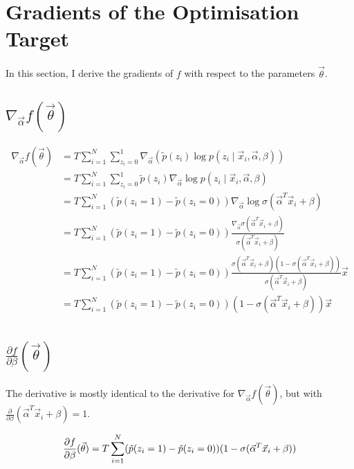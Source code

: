 \documentclass[a4paper]{article}
\begin{document}
    \section{Gradients of the Optimisation Target}

        In this section, I derive the gradients of $f$ with respect to the parameters $\vec \theta$.

        \subsection{$\nabla_{\vec \alpha} f(\vec \theta)$}

            \begin{align*}
                \nabla_{\vec \alpha} f(\vec \theta) &= T \sum_{i = 1}^N \sum_{z_i = 0}^1 \nabla_{\vec \alpha} (\tilde p(z_i) \log p(z_i \mid \vec x_i, \vec \alpha, \beta))\\
                    &= T \sum_{i = 1}^N \sum_{z_i = 0}^1 \tilde p(z_i) \nabla_{\vec \alpha} \log p(z_i \mid \vec x_i, \vec \alpha, \beta)\\
                    &= T \sum_{i = 1}^N (\tilde p(z_i = 1) - \tilde p(z_i = 0)) \nabla_{\vec \alpha} \log \sigma(\vec \alpha^T \vec x_i + \beta)\\
                    &= T \sum_{i = 1}^N (\tilde p(z_i = 1) - \tilde p(z_i = 0)) \frac{\nabla_{\vec \alpha} \sigma(\vec \alpha^T \vec x_i + \beta)}{\sigma(\vec \alpha^T \vec x_i + \beta)}\\
                    &= T \sum_{i = 1}^N (\tilde p(z_i = 1) - \tilde p(z_i = 0)) \frac{\sigma(\vec \alpha^T \vec x_i + \beta)(1 - \sigma(\vec \alpha^T \vec x_i + \beta))}{\sigma(\vec \alpha^T \vec x_i + \beta)} \vec x\\
                    &= T \sum_{i = 1}^N (\tilde p(z_i = 1) - \tilde p(z_i = 0)) (1 - \sigma(\vec \alpha^T \vec x_i + \beta)) \vec x\\
            \end{align*}

        \subsection{$\frac{\partial f}{\partial \beta}(\vec \theta)$}

            The derivative is mostly identical to the derivative for $\nabla_{\vec \alpha} f(\vec \theta)$, but with $\frac{\partial}{\partial \beta} (\vec \alpha^T \vec x_i + \beta) = 1$.

            \[
                \frac{\partial f}{\partial \beta}(\vec \theta) = T \sum_{i = 1}^N (\tilde p(z_i = 1) - \tilde p(z_i = 0)) (1 - \sigma(\vec \alpha^T \vec x_i + \beta))\\
            \]

    
    
\end{document}
